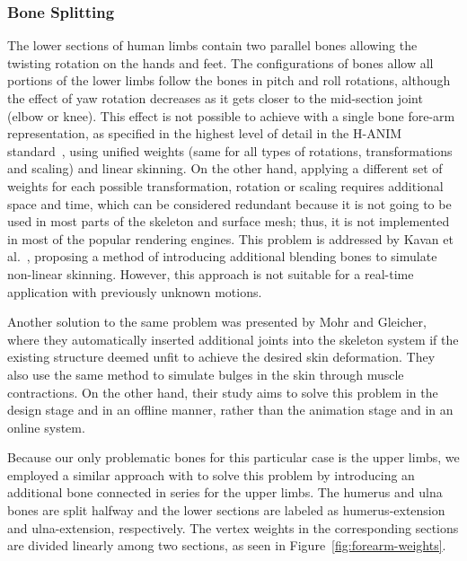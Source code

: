 \documentclass[number,preprint,review,12pt]{elsarticle}
\begin{document}
\subsubsection{Bone Splitting}
The lower sections of human limbs contain two parallel bones allowing the twisting rotation on the hands and feet. The configurations of bones allow all portions of the lower limbs follow the bones in pitch and roll rotations, although the effect of yaw rotation decreases as it gets closer to the mid-section joint (elbow or knee). This effect is not possible to achieve with a single bone fore-arm representation, as specified in the highest level of detail in the H-ANIM standard~\cite{HANIM}, using unified weights (same for all types of rotations, transformations and scaling) and linear skinning. On the other hand, applying a different set of weights for each possible transformation, rotation or scaling requires additional space and time, which can be considered redundant because it is not going to be used in most parts of the skeleton and surface mesh; thus, it is not implemented in most of the popular rendering engines. This problem is addressed by Kavan et al.~\cite{Kavan2009}, proposing a method of introducing additional blending bones to simulate non-linear skinning. However, this approach is not suitable for a real-time application with previously unknown motions. 

Another solution to the same problem was presented by Mohr and Gleicher\cite{Mohr2003}, where they automatically inserted additional joints into the skeleton system if the existing structure deemed unfit to achieve the desired skin deformation. They also use the same method to simulate bulges in the skin through muscle contractions. On the other hand, their study aims to solve this problem in the design stage and in an offline manner, rather than the animation stage and in an online system. 

Because our only problematic bones for this particular case is the upper limbs, we employed a similar approach with \cite{Mohr2003} to solve this problem by introducing an additional bone connected in series for the upper limbs. The humerus and ulna bones are split halfway and the lower sections are labeled as humerus-extension and ulna-extension, respectively. The vertex weights in the corresponding sections are divided linearly among two sections, as seen in Figure~\ref{fig:forearm-weights}. 
\end{document}
